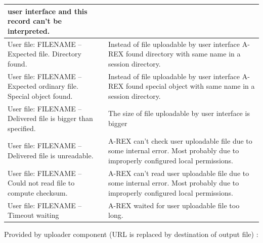 \documentclass{article}                            %
\begin{document}
\begin{longtable}{|p{5cm}|p{10cm}|}
user interface and this record can't be interpreted.\tabularnewline
\hline 
User file: FILENAME -- Expected file. Directory found.&
Instead of file uploadable by user interface A-REX found directory
with same name in a session directory.\tabularnewline
\hline 
User file: FILENAME -- Expected ordinary file. Special object found.&
Instead of file uploadable by user interface A-REX found special object
with same name in a session directory.\tabularnewline
\hline 
User file: FILENAME -- Delivered file is bigger than specified.&
The size of file uploadable by user interface is bigger \tabularnewline
\hline
User file: FILENAME -- Delivered file is unreadable.&
A-REX can't check user uploadable file due to some internal error.
Most probably due to improperly configured local permissions.\tabularnewline
\hline
User file: FILENAME -- Could not read file to compute checksum.&
A-REX can't read user uploadable file due to some internal error.
Most probably due to improperly configured local permissions.\tabularnewline
\hline
User file: FILENAME -- Timeout waiting&
A-REX waited for user uploadable file too long.\tabularnewline
\hline
\end{longtable}

Provided by uploader component (URL is replaced by destination of
output file) :
\end{document}
